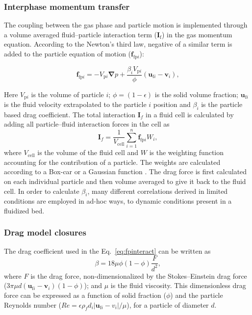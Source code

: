 \documentclass[11pt,a4paper,openright]{article}
\begin{document}
\subsubsection{Interphase momentum transfer}
\label{sec:Momentum}

The coupling between the gas phase and particle motion is implemented through a volume averaged fluid--particle interaction term ($\mathbf{I}_{\mathrm f}$) in the gas momentum equation. According to the Newton's third law, negative of a similar term is added to the particle equation of motion ($\mathbf{f}_{\mathrm{fp}i}$):

\begin{equation}
	\label{eq:fpinteract}
\mathbf{f}_{\mathrm{fp}i} = - V_{\mathrm{p}i} \boldsymbol{\nabla} p    + \frac{\beta_i V_{\mathrm{p}i} }{\phi}\left ( \mathbf{u}_{\mathrm{f}i} -\mathbf{v}_{i}\right )  \text{,}
\end{equation}

Here $V_{\mathrm{p}i}$ is the volume of particle $i$; $\phi = (1 -\epsilon)$ is the solid volume fraction; $\mathbf{u}_{\mathrm{f}i}$ is the fluid velocity extrapolated to the particle $i$ position and $\beta_i$ is the particle based drag coefficient. The total interaction $\mathbf{I}_{f}$ in a fluid cell is calculated by adding all particle--fluid interaction forces in the cell as 
\begin{equation}
\mathbf{I}_{f} = \frac{1}{V_{\mathrm{cell}}}\sum_{i=1}^{n}\mathbf{f}_{\mathrm{fp}i} W_i \text{,}
\end{equation}
where $V_{\mathrm{cell}}$ is the volume of the fluid cell and $W$ is the weighting function accounting for the contribution of a particle. The weights are calculated according to a Box-car or a Gaussian function \citep{xiao2011algorithms}. The drag force is first calculated on each individual particle and then volume averaged to give it back to the fluid cell. In order to calculate $\beta_i$, many different correlations derived in limited conditions are employed in ad-hoc ways, to dynamic conditions present in a fluidized bed.

\subsubsection{Drag model closures \label{sec:Drag}}

The drag coefficient used in the Eq.~\ref{eq:fpinteract} can be written as
\begin{equation}
\label{eq:Fbeta}
\beta = 18 \mu \phi (1-\phi)\frac{F}{d^2} \text{,}
\end{equation}
where $F$ is the drag force, non-dimensionalized by the Stokes--Einstein drag force  ($3 \pi \mu d \left ( \mathbf{u}_{\mathrm{f}i} -\mathbf{v}_{i} \right ) (1-\phi) $); and $\mu$ is the fluid viscosity. This dimensionless drag force can be expressed as a function of solid fraction ($\phi$) and the particle Reynolds number ($Re = \epsilon \rho_{f}d_{i} \left | \mathbf{u}_{\mathrm{f}i} -v_{i} \right | / \mu$), for a particle of diameter $d$.
\end{document}
